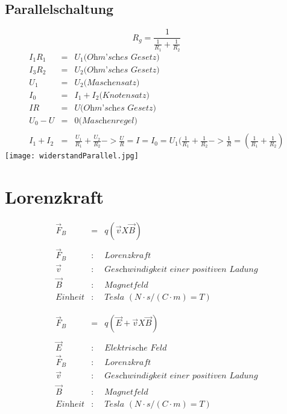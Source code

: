 \documentclass[11pt]{article}
\begin{document}
\subsection{Parallelschaltung}
$$R_g= \frac{1}{\frac{1}{R_1}+\frac{1}{R_2}}$$
\begin{eqnarray*}
I_1R_1 &=& U_1 \textit{(Ohm'sches Gesetz)}\\
I_3R_2 &=& U_2 \textit{(Ohm'sches Gesetz)}\\
U_1 &=& U_2 \textit{(Maschensatz)}\\
I_0 &=& I_1 + I_2 \textit{(Knotensatz)}\\
IR &=& U \textit{(Ohm'sches Gesetz)}\\
U_0 - U &=& 0 \textit{(Maschenregel)}\\\\
I_1+I_2 &=& \frac{U_1}{R_1}+\frac{U_2}{R_2} -> \frac{U}{R}=I = I_0 = U_1(\frac{1}{R_1}+\frac{1}{R_2} -> \frac{1}{R} = (\frac{1}{R_1}+\frac{1}{R_2})
\end{eqnarray*}
\texttt{[image: widerstandParallel.jpg]}

\section{Lorenzkraft}
\begin{eqnarray*}
\overrightarrow{F}_B&=&q(\overrightarrow{v}X\overrightarrow{B})\\\\
\overrightarrow{F}_B &:& \textit{Lorenzkraft}\\
\overrightarrow{v}&:& \textit{Geschwindigkeit einer positiven Ladung}\\
\overrightarrow{B}&:& \textit{Magnetfeld}\\
\textit{Einheit}&:& \textit{Tesla } (N\cdot s /(C\cdot m) = T)
\end{eqnarray*} 

\begin{eqnarray*}
\overrightarrow{F}_B&=&q(\overrightarrow{E}+\overrightarrow{v}X\overrightarrow{B})\\\\
\overrightarrow{E}&:& \textit{Elektrische Feld}\\
\overrightarrow{F}_B &:& \textit{Lorenzkraft}\\
\overrightarrow{v}&:& \textit{Geschwindigkeit einer positiven Ladung}\\
\overrightarrow{B}&:& \textit{Magnetfeld}\\
\textit{Einheit}&:& \textit{Tesla } (N\cdot s /(C\cdot m) = T)
\end{eqnarray*}
\end{document}
